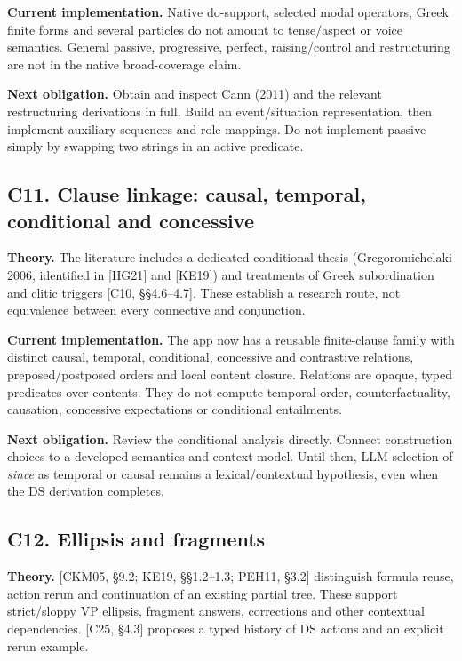 \documentclass[11pt,a4paper]{article}
\begin{document}
\textbf{Current implementation.} Native do-support, selected modal
operators, Greek finite forms and several particles do not amount to
tense/aspect or voice semantics. General passive, progressive, perfect,
raising/control and restructuring are not in the native broad-coverage
claim.

\textbf{Next obligation.} Obtain and inspect Cann (2011) and the
relevant restructuring derivations in full. Build an event/situation
representation, then implement auxiliary sequences and role mappings. Do
not implement passive simply by swapping two strings in an active
predicate.

\subsection{C11. Clause linkage: causal, temporal, conditional and
concessive}\label{c11.-clause-linkage-causal-temporal-conditional-and-concessive}

\textbf{Theory.} The literature includes a dedicated conditional thesis
(Gregoromichelaki 2006, identified in {[}HG21{]} and {[}KE19{]}) and
treatments of Greek subordination and clitic triggers {[}C10,
§§4.6--4.7{]}. These establish a research route, not equivalence between
every connective and conjunction.

\textbf{Current implementation.} The app now has a reusable
finite-clause family with distinct causal, temporal, conditional,
concessive and contrastive relations, preposed/postposed orders and
local content closure. Relations are opaque, typed predicates over
contents. They do not compute temporal order, counterfactuality,
causation, concessive expectations or conditional entailments.

\textbf{Next obligation.} Review the conditional analysis directly.
Connect construction choices to a developed semantics and context model.
Until then, LLM selection of \emph{since} as temporal or causal remains
a lexical/contextual hypothesis, even when the DS derivation completes.

\subsection{C12. Ellipsis and
fragments}\label{c12.-ellipsis-and-fragments}

\textbf{Theory.} {[}CKM05, §9.2; KE19, §§1.2--1.3; PEH11, §3.2{]}
distinguish formula reuse, action rerun and continuation of an existing
partial tree. These support strict/sloppy VP ellipsis, fragment answers,
corrections and other contextual dependencies. {[}C25, §4.3{]} proposes
a typed history of DS actions and an explicit rerun example.
\end{document}

